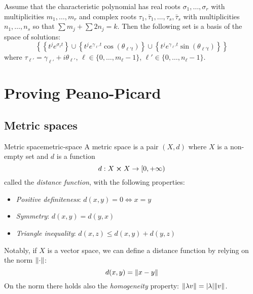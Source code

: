 \documentclass[12pt]{extarticle}
\begin{document}
\begin{theorem}{}{}
	Assume that the characteristic polynomial has real roots $\sigma_1, \dots, \sigma_r$ with multiplicities \newline $m_1,\dots,m_r$ and complex roots $\tau_1, \bar \tau_1, \dots, \tau_s, \bar \tau_s$ with multiplicities $n_1, \dots, n_s$ so that
	$\sum m_j + \sum 2n_j = k$.
	Then the following set is a basis of the space of solutions:
	\begin{equation}
		\left\{ \left\{ t^je^{\sigma_\ell t} \right\} \cup \left\{ t^je^{\gamma_{\ell'} t} \cos(\theta_{\ell' t}) \right\} \cup \left\{ t^je^{\gamma_{\ell'} t} \sin(\theta_{\ell' t}) \right\} \right\}
	\end{equation}
	where $\tau_{\ell'} =\gamma_{\ell'} + i \theta _{\ell'}$, $\ell \in \{0, \dots, m_\ell-1\}$, $\ell' \in \{ 0,\dots, n_\ell -1 \}$.
\end{theorem}


\section{Proving Peano-Picard}

\subsection{Metric spaces}

\begin{definition}{Metric space}{metric-space}
	A metric space is a pair $(X, d)$ where $X$ is a non-empty set and $d$ is a function
	\begin{equation}
		d: X \cross X \to [0, +\infty)
	\end{equation}
	called the \emph{distance function}, with the following properties:
	\begin{itemize}
		\item \emph{Positive definiteness}: $d(x, y) = 0 \iff x = y$
		\item \emph{Symmetry}: $d(x, y) = d(y, x)$
		\item \emph{Triangle inequality}: $d(x, z) \leq d(x, y) + d(y, z)$
	\end{itemize}
\end{definition}

Notably, if $X$ is a vector space, we can define a distance function by relying on the norm $\norm{\cdot}$:
\begin{equation}
	d(x, y) = \norm{x - y}
\end{equation}
On the norm there holds also the \emph{homogeneity} property: $\norm{\lambda v} = \abs{\lambda}\norm{v}$.
\end{document}
